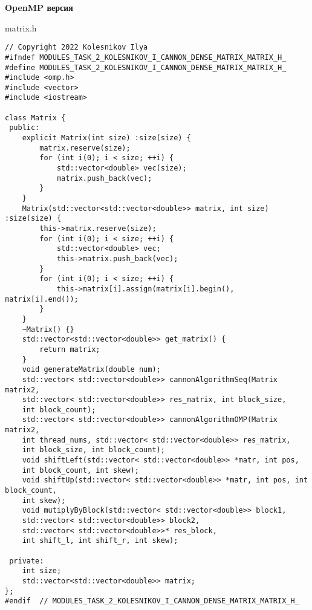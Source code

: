 \documentclass{report}
\begin{document}
\textbf{OpenMP версия}


matrix.h
\begin{lstlisting}
// Copyright 2022 Kolesnikov Ilya
#ifndef MODULES_TASK_2_KOLESNIKOV_I_CANNON_DENSE_MATRIX_MATRIX_H_
#define MODULES_TASK_2_KOLESNIKOV_I_CANNON_DENSE_MATRIX_MATRIX_H_
#include <omp.h>
#include <vector>
#include <iostream>

class Matrix {
 public:
    explicit Matrix(int size) :size(size) {
        matrix.reserve(size);
        for (int i(0); i < size; ++i) {
            std::vector<double> vec(size);
            matrix.push_back(vec);
        }
    }
    Matrix(std::vector<std::vector<double>> matrix, int size) :size(size) {
        this->matrix.reserve(size);
        for (int i(0); i < size; ++i) {
            std::vector<double> vec;
            this->matrix.push_back(vec);
        }
        for (int i(0); i < size; ++i) {
            this->matrix[i].assign(matrix[i].begin(), matrix[i].end());
        }
    }
    ~Matrix() {}
    std::vector<std::vector<double>> get_matrix() {
        return matrix;
    }
    void generateMatrix(double num);
    std::vector< std::vector<double>> cannonAlgorithmSeq(Matrix matrix2,
    std::vector< std::vector<double>> res_matrix, int block_size,
    int block_count);
    std::vector< std::vector<double>> cannonAlgorithmOMP(Matrix matrix2,
    int thread_nums, std::vector< std::vector<double>> res_matrix,
    int block_size, int block_count);
    void shiftLeft(std::vector< std::vector<double>> *matr, int pos,
    int block_count, int skew);
    void shiftUp(std::vector< std::vector<double>> *matr, int pos, int block_count,
    int skew);
    void mutiplyByBlock(std::vector< std::vector<double>> block1,
    std::vector< std::vector<double>> block2,
    std::vector< std::vector<double>>* res_block,
    int shift_l, int shift_r, int skew);

 private:
    int size;
    std::vector<std::vector<double>> matrix;
};
#endif  // MODULES_TASK_2_KOLESNIKOV_I_CANNON_DENSE_MATRIX_MATRIX_H_
\end{lstlisting}
\end{document}
